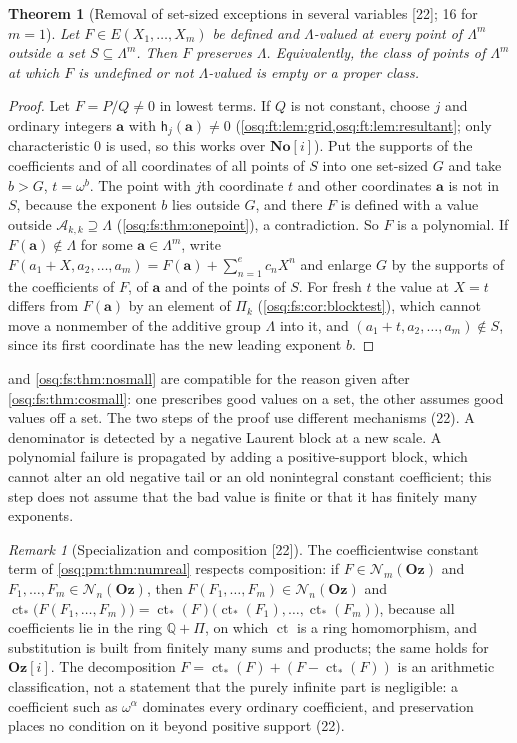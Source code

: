 \documentclass[11pt,letterpaper]{article}
\numberwithin{equation}{section}
\newtheorem{theorem}{Theorem}[section]
\theoremstyle{definition}
\theoremstyle{remark}
\newtheorem{remark}[remark]{Remark}
\theoremstyle{plain}
\newcommand{\No}{\mathbf{No}}
\newcommand{\Oz}{\mathbf{Oz}}
\newcommand{\SC}{\No[i]}
\newcommand{\GOz}{\Oz[i]}
\newcommand{\Q}{\mathbb Q}
\newcommand{\A}{\mathcal A}          %
\newcommand{\ct}{\operatorname{ct}}
\newcommand{\Num}{\mathscr N}
\newcommand{\src}[1]{\textup{\textsf{[#1]}}}
\begin{document}
\begin{theorem}[Removal of set-sized exceptions in several variables \src{22}; 16 for $m=1$]\label{osq:ft:thm:exceptions}
Let $F\in E(X_1,\dots,X_m)$ be defined and $\Lambda$-valued at every point of $\Lambda^m$ outside a set $S\subseteq\Lambda^m$. Then $F$ preserves
$\Lambda$. Equivalently, the class of points of $\Lambda^m$ at which $F$ is undefined or not $\Lambda$-valued is empty or a proper class.
\end{theorem}
\begin{proof}
Let $F=P/Q\ne0$ in lowest terms. If $Q$ is not constant, choose $j$ and ordinary integers $\mathbf a$ with $\mathsf h_j(\mathbf a)\ne0$
(\cref{osq:ft:lem:grid,osq:ft:lem:resultant}; only characteristic $0$ is used, so this works over $\SC$). Put the supports of the coefficients and of all
coordinates of all points of $S$ into one set-sized $G$ and take $b>G$, $t=\omega^b$. The point with $j$th coordinate $t$ and other coordinates
$\mathbf a$ is not in $S$, because the exponent $b$ lies outside $G$, and there $F$ is defined with a value outside $\A_{k,k}\supseteq\Lambda$
(\cref{osq:fs:thm:onepoint}), a contradiction. So $F$ is a polynomial. If $F(\mathbf a)\notin\Lambda$ for some $\mathbf a\in\Lambda^m$, write
$F(a_1+X,a_2,\dots,a_m)=F(\mathbf a)+\sum_{n=1}^ec_nX^n$ and enlarge $G$ by the supports of the coefficients of $F$, of $\mathbf a$ and of the points
of $S$. For fresh $t$ the value at $X=t$ differs from $F(\mathbf a)$ by an element of $\Pi_k$ (\cref{osq:fs:cor:blocktest}), which cannot move a
nonmember of the additive group $\Lambda$ into it, and $(a_1+t,a_2,\dots,a_m)\notin S$, since its first coordinate has the new leading exponent $b$.
\end{proof}

 and \cref{osq:fs:thm:nosmall} are compatible for the reason given after \cref{osq:fs:thm:cosmall}: one prescribes good
values on a set, the other assumes good values off a set. The two steps of the proof use different mechanisms (22). A denominator is detected by a
negative Laurent block at a new scale. A polynomial failure is propagated by adding a positive-support block, which cannot alter an old negative tail or
an old nonintegral constant coefficient; this step does not assume that the bad value is finite or that it has finitely many exponents.

\begin{remark}[Specialization and composition \src{22}]\label{osq:ft:rem:composition}
The coefficientwise constant term of \cref{osq:pm:thm:numreal} respects composition: if $F\in\Num_m(\Oz)$ and $F_1,\dots,F_m\in\Num_n(\Oz)$, then
$F(F_1,\dots,F_m)\in\Num_n(\Oz)$ and $\ct_*\bigl(F(F_1,\dots,F_m)\bigr)=\ct_*(F)\bigl(\ct_*(F_1),\dots,\ct_*(F_m)\bigr)$, because all coefficients lie
in the ring $\Q+\Pi$, on which $\ct$ is a ring homomorphism, and substitution is built from finitely many sums and products; the same holds for $\GOz$.
The decomposition $F=\ct_*(F)+(F-\ct_*(F))$ is an arithmetic classification, not a statement that the purely infinite part is negligible: a coefficient
such as $\omega^\alpha$ dominates every ordinary coefficient, and preservation places no condition on it beyond positive support (22).
\end{remark}
\end{document}
